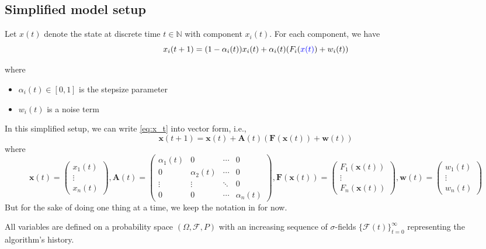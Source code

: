 \subsection{Simplified model setup}
Let $x(t)$ denote the state at discrete time $t\in\mathbb{N}$ with component $x_i(t)$. For each component, we have
\begin{equation}
    x_i(t+1) = (1-\alpha_i(t))x_i(t) + \alpha_i(t)(F_i(\textcolor{blue}{x(t)}) + w_i(t)) 
\end{equation}\label{eq:x_t}

where
\begin{itemize}
    \item $\alpha_i(t) \in [0,1]$ is the stepsize parameter
    \item $w_i(t)$ is a noise term
\end{itemize}
\begin{remark}
    In this simplified setup, we can write \autoref{eq:x_t} into vector form, i.e.,
    $$
    \mathbf{x}(t+1) = \mathbf{x}(t) + \mathbf{A}(t)(\mathbf{F}(\mathbf{x}(t)) +\mathbf{w}(t))
    $$
    where
    $$
    \mathbf{x}(t) = \begin{pmatrix}
        x_1(t)\\
        \vdots\\
        x_n(t)
    \end{pmatrix},\mathbf{A}(t) = \begin{pmatrix}
        \alpha_1(t) & 0& \cdots & 0\\
        0& \alpha_2(t) & \cdots & 0\\
        \vdots & \vdots & \ddots & 0\\
        0 &0 &\cdots & \alpha_n(t)
    \end{pmatrix},\mathbf{F}(\mathbf{x}(t)) = \begin{pmatrix}
        F_1(\mathbf{x}(t))\\
        \vdots\\
        F_n(\mathbf{x}(t))
    \end{pmatrix},\mathbf{w}(t) = \begin{pmatrix}
        w_1(t)\\
        \vdots\\
        w_n(t)
    \end{pmatrix}
    $$
    But for the sake of doing one thing at a time, we keep the notation in \cite{tsitsiklis1994asynchronous} for now.
\end{remark}
All variables are defined on a probability space $(\Omega, \mathcal{F}, P)$ with an increasing sequence of $\sigma$-fields $\{\mathcal{F}(t)\}_{t=0}^{\infty}$ representing the algorithm's history. \\
